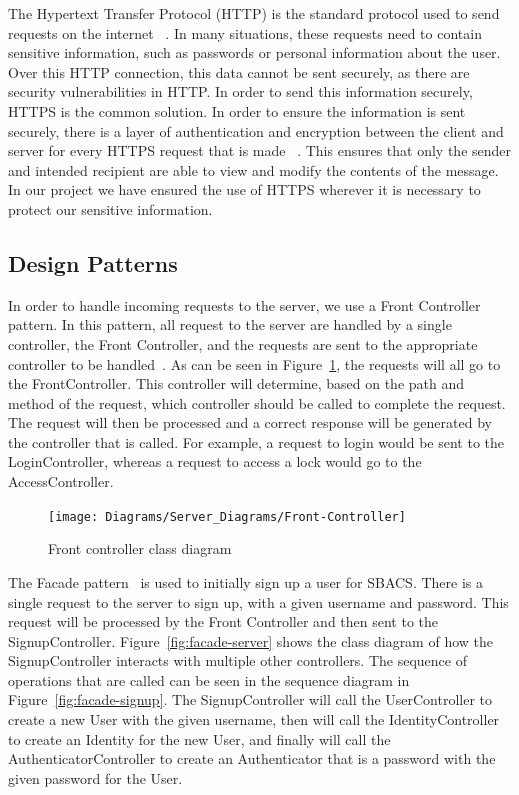 \documentclass[12pt]{report}
\let\Oldsubsection\subsection
\renewcommand{\subsection}{\FloatBarrier\Oldsubsection}
\begin{document}
The Hypertext Transfer Protocol (HTTP) is the standard protocol used to send requests on the internet ~\autocite{HTTPREF}.
In many situations, these requests need to contain sensitive information, such as passwords or personal
information about the user. Over this HTTP connection, this data cannot be sent securely, as there are
security vulnerabilities in HTTP. In order to send this information securely, HTTPS is the common
solution. In order to ensure the information is sent securely, there is a layer of authentication
and encryption between the client and server for every HTTPS request that is made ~\autocite{HTTPSVSHTTP}. This ensures that
only the sender and intended recipient are able to view and modify the contents of the message. In our
project we have ensured the use of HTTPS wherever it is necessary to protect our sensitive information.


\subsection{Design Patterns} \label{design-patterns}


In order to handle incoming requests to the server, we use a Front Controller pattern. In this pattern,
all request to the server are handled by a single controller, the Front Controller, and the requests
are sent to the appropriate controller to be handled~\autocite{FRONTCONTROLLER}. As can be seen in
Figure~\ref{fig:front-controller},
the requests will all go to the FrontController. This controller will determine, based on the path and
method of the request, which controller should be called to complete the request. The request will then
be processed and a correct response will be generated by the controller that is called. For example,
a request to login would be sent to the LoginController, whereas a request to access a lock would go 
to the AccessController.

\begin{figure}
    \texttt{[image: Diagrams/Server\_Diagrams/Front-Controller]}
    \caption{Front controller class diagram}
    \label{fig:front-controller}
\end{figure}

The Facade pattern~\autocite{DESIGNPATTERNSGOF} is used to initially sign up a user for SBACS. There is a single request to the
server to sign up, with a given username and password. This request will be processed by the
Front Controller and then sent to the SignupController. Figure~\ref{fig:facade-server} shows the
class diagram of how the SignupController interacts with multiple other controllers. The sequence
of operations that are called can be seen in the sequence diagram in Figure~\ref{fig:facade-signup}.
The SignupController will call the UserController
to create a new User with the given username, then will call the IdentityController to create an Identity
for the new User, and finally will call the AuthenticatorController to create an Authenticator that is
a password with the given password for the User. 
\end{document}
